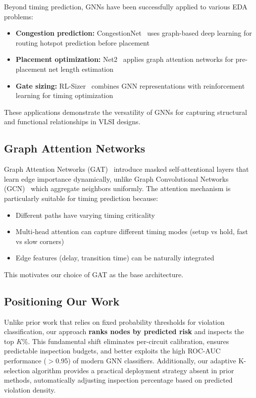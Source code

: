 \documentclass[10pt,twocolumn,journal]{IEEEtran}
\begin{document}
Beyond timing prediction, GNNs have been successfully applied to various EDA problems:
\begin{itemize}
    \item \textbf{Congestion prediction:} CongestionNet~\cite{kirby2019congestionnet} uses graph-based deep learning for routing hotspot prediction before placement
    \item \textbf{Placement optimization:} Net2~\cite{xie2021net2} applies graph attention networks for pre-placement net length estimation
    \item \textbf{Gate sizing:} RL-Sizer~\cite{lu2021rlsizer} combines GNN representations with reinforcement learning for timing optimization
\end{itemize}

These applications demonstrate the versatility of GNNs for capturing structural and functional relationships in VLSI designs.

\subsection{Graph Attention Networks}

Graph Attention Networks (GAT)~\cite{velickovic2018gat} introduce masked self-attentional layers that learn edge importance dynamically, unlike Graph Convolutional Networks (GCN)~\cite{kipf2017gcn} which aggregate neighbors uniformly. The attention mechanism is particularly suitable for timing prediction because:
\begin{itemize}
    \item Different paths have varying timing criticality
    \item Multi-head attention can capture different timing modes (setup vs hold, fast vs slow corners)
    \item Edge features (delay, transition time) can be naturally integrated
\end{itemize}

This motivates our choice of GAT as the base architecture.

\subsection{Positioning Our Work}

Unlike prior work that relies on fixed probability thresholds for violation classification, our approach \textbf{ranks nodes by predicted risk} and inspects the top $K$\%. This fundamental shift eliminates per-circuit calibration, ensures predictable inspection budgets, and better exploits the high ROC-AUC performance ($>$0.95) of modern GNN classifiers. Additionally, our adaptive K-selection algorithm provides a practical deployment strategy absent in prior methods, automatically adjusting inspection percentage based on predicted violation density.
\end{document}
